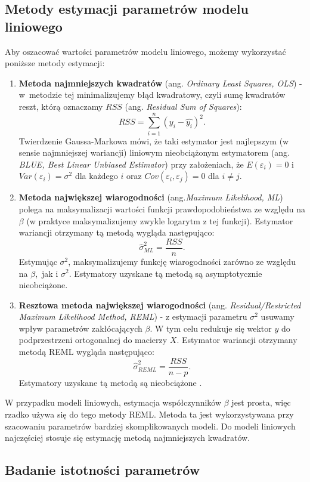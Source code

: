 \documentclass[12pt]{mwbk}
\theoremstyle{plain}
\theoremstyle{definition}
\theoremstyle{definition}
\begin{document}
\subsection{Metody estymacji parametrów modelu liniowego}
Aby oszacować wartości parametrów modelu liniowego, możemy wykorzystać poniższe metody estymacji:
\begin{enumerate}
	\item \textbf{Metoda najmniejszych kwadratów} (ang. \emph{Ordinary Least Squares, OLS}) - w~metodzie tej minimalizujemy błąd kwadratowy, czyli sumę kwadratów reszt, którą oznaczamy $RSS$ (ang. \emph{Residual Sum of Squares}):
	$$RSS= \sum_{i=1}^{n}(y_i-\hat{y_i})^2.$$
	Twierdzenie Gaussa-Markowa mówi, że taki estymator jest najlepszym (w sensie najmniejszej wariancji) liniowym nieobciążonym estymatorem (ang. \textit{BLUE, Best Linear Unbiased Estimator}) przy założeniach, że $E(\varepsilon_i)=0$ i $Var(\varepsilon_i)=\sigma^2$ dla każdego $i$ oraz $Cov(\varepsilon_i, \varepsilon_j)=0$ dla $i \neq j$.

	\item \textbf{Metoda największej wiarogodności} (ang.\textit{Maximum Likelihood, ML}) polega na maksymalizacji wartości funkcji prawdopodobieństwa ze względu na $\beta$ (w praktyce maksymalizujemy zwykle logarytm z tej funkcji). Estymator wariancji otrzymany tą metodą wygląda następująco:
	$$\hat{\sigma}^{2}_{ML}=\frac{RSS}{n}.$$
	Estymując $\sigma^2$, maksymalizujemy funkcję wiarogodności zarówno ze względu na $\beta$,~jak i $\sigma^2$.
	Estymatory uzyskane tą metodą są asymptotycznie nieobciążone.
	
	\item \textbf{Resztowa metoda największej wiarogodności} (ang. \textit{Residual/Restricted Maximum Likelihood Method, REML}) - z estymacji parametru $\sigma^2$ usuwamy wpływ parametrów zakłócających $\beta$. W tym celu redukuje się wektor $y$ do podprzestrzeni ortogonalnej do macierzy $X$. Estymator wariancji otrzymany metodą REML wygląda następująco:
	$$\hat{\sigma}^2_{REML}=\frac{RSS}{n-p}.$$
	Estymatory uzyskane tą metodą są nieobciążone \cite{biecek}.
\end{enumerate}

W przypadku modeli liniowych, estymacja współczynników $\beta$ jest prosta, więc rzadko używa się do tego metody REML. Metoda ta jest wykorzystywana przy szacowaniu parametrów bardziej skomplikowanych modeli. Do modeli liniowych najczęściej stosuje się estymację metodą najmniejszych kwadratów.

\subsection{Badanie istotności parametrów}
\end{document}
